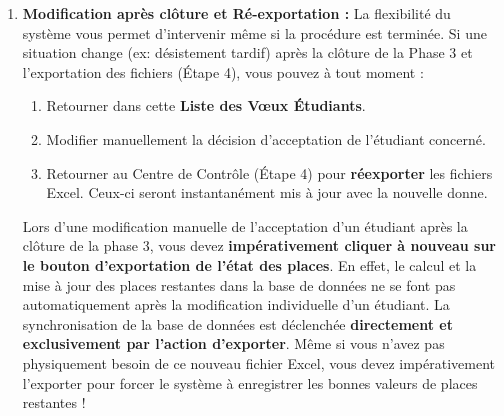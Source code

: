 \documentclass[12pt,a4paper]{article}
\begin{document}
\begin{enumerate}
    \item \textbf{Modification après clôture et Ré-exportation :}
    La flexibilité du système vous permet d'intervenir même si la procédure est terminée. Si une situation change (ex: désistement tardif) après la clôture de la Phase 3 et l'exportation des fichiers (Étape 4), vous pouvez à tout moment :
    \begin{enumerate}[label=\alph*)]
        \item Retourner dans cette \textbf{Liste des Vœux Étudiants}.
        \item Modifier manuellement la décision d'acceptation de l'étudiant concerné.
        \item Retourner au Centre de Contrôle (Étape 4) pour \textbf{réexporter} les fichiers Excel. Ceux-ci seront instantanément mis à jour avec la nouvelle donne.
    \end{enumerate}
    \begin{tcolorbox}[colback=red!5!white,colframe=red!75!black,title=⚠️ EXIGENCE TECHNIQUE IMPÉRATIVE]
    Lors d'une modification manuelle de l'acceptation d'un étudiant après la clôture de la phase 3, vous devez \textbf{impérativement cliquer à nouveau sur le bouton d'exportation de l'état des places}.
    \newline En effet, le calcul et la mise à jour des places restantes dans la base de données ne se font pas automatiquement après la modification individuelle d'un étudiant. La synchronisation de la base de données est déclenchée \textbf{directement et exclusivement par l'action d'exporter}. Même si vous n'avez pas physiquement besoin de ce nouveau fichier Excel, vous devez impérativement l'exporter pour forcer le système à enregistrer les bonnes valeurs de places restantes !
    \end{tcolorbox}
\end{enumerate}
\end{document}
